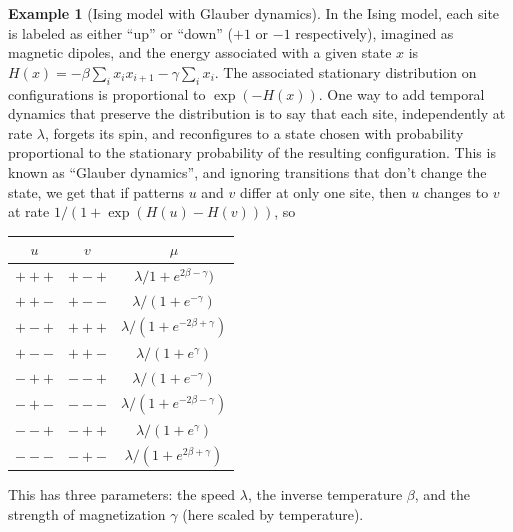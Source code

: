 \documentclass{article}
\theoremstyle{plain}
\theoremstyle{definition}
\newtheorem{example}{Example}[section]
\begin{document}
\begin{example}[Ising model with Glauber dynamics]
  In the Ising model, each site is labeled as either ``up'' or ``down'' ($+1$ or $-1$ respectively),
  imagined as magnetic dipoles,
  and the energy associated with a given state $x$ is $H(x) = - \beta \sum_i x_i x_{i+1} - \gamma \sum_i x_i$.
  The associated stationary distribution on configurations is proportional to $\exp(-H(x))$.
  One way to add temporal dynamics that preserve the distribution 
  is to say that each site, independently at rate $\lambda$,
  forgets its spin, 
  and reconfigures to a state chosen with probability proportional to the stationary probability of the resulting configuration.
  This is known as ``Glauber dynamics'', and ignoring transitions that don't change the state,
  we get that if patterns $u$ and $v$ differ at only one site, then $u$ changes to $v$ at rate $1/(1+\exp(H(u)-H(v)))$, so

  \begin{center}
    \begin{tabular}{c@{\quad$\to$\quad}c@{\quad at rate\quad }c}
      $u$  &  $v$  &  $\mu$  \\
      \hline
      $+++$  &   $+-+$   &  $\lambda/1+e^{2\beta - \gamma})$ \\
      $++-$  &   $+--$   &  $\lambda/(1+e^{-\gamma})$ \\
      $+-+$  &   $+++$   &  $\lambda/(1+e^{-2\beta + \gamma})$ \\
      $+--$  &   $++-$   &  $\lambda/(1+e^{\gamma})$ \\
      $-++$  &   $--+$   &  $\lambda/(1+e^{-\gamma})$ \\
      $-+-$  &   $---$   &  $\lambda/(1+e^{-2\beta - \gamma})$ \\
      $--+$  &   $-++$   &  $\lambda/(1+e^{\gamma})$ \\
      $---$  &   $-+-$   &  $\lambda/(1+e^{2\beta + \gamma})$ 
    \end{tabular}
  \end{center}

  This has three parameters: the speed $\lambda$, the inverse temperature $\beta$, and the strength of magnetization $\gamma$
  (here scaled by temperature).

\end{example}
\end{document}
